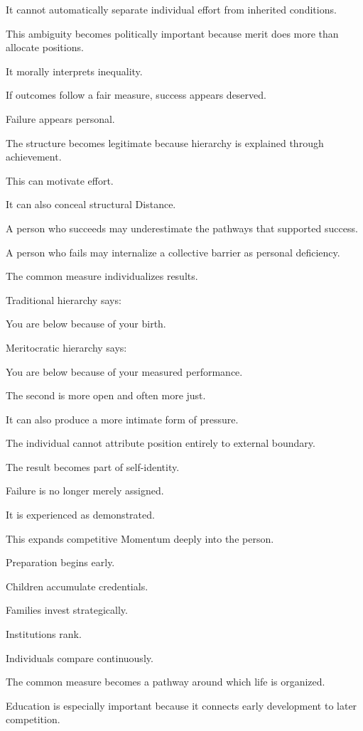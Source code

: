 It cannot automatically separate individual effort from inherited conditions.

This ambiguity becomes politically important because merit does more than allocate positions.

It morally interprets inequality.

If outcomes follow a fair measure, success appears deserved.

Failure appears personal.

The structure becomes legitimate because hierarchy is explained through achievement.

This can motivate effort.

It can also conceal structural Distance.

A person who succeeds may underestimate the pathways that supported success.

A person who fails may internalize a collective barrier as personal deficiency.

The common measure individualizes results.

Traditional hierarchy says:

You are below because of your birth.

Meritocratic hierarchy says:

You are below because of your measured performance.

The second is more open and often more just.

It can also produce a more intimate form of pressure.

The individual cannot attribute position entirely to external boundary.

The result becomes part of self-identity.

Failure is no longer merely assigned.

It is experienced as demonstrated.

This expands competitive Momentum deeply into the person.

Preparation begins early.

Children accumulate credentials.

Families invest strategically.

Institutions rank.

Individuals compare continuously.

The common measure becomes a pathway around which life is organized.

Education is especially important because it connects early development to later competition.

